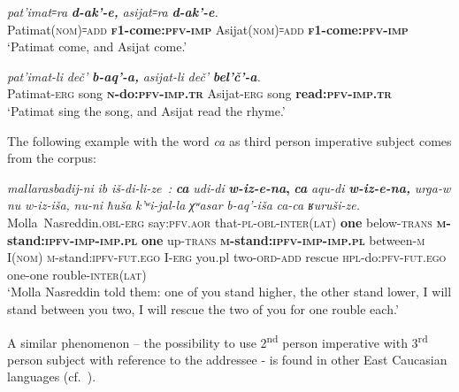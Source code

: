 ﻿\documentclass[output=paper]{langsci/langscibook}
\begin{document}
\ea %
\gll  \emph{pat'imat꞊ra}  \emph{\textbf{d-ak'-e,}}  \emph{asijat꞊ra}  \emph{\textbf{d-ak'-e}.}\\
 Patimat(\textsc{nom})꞊\textsc{add}  \textbf{\textsc{f1}-come:\textsc{pfv}-\textsc{imp}}  Asijat(\textsc{nom})꞊\textsc{add}  \textbf{\textsc{f1}-come:\textsc{pfv}-\textsc{imp}}\\
\glt `Patimat come, and Asijat come.'

\ex %
\gll  \emph{pat'imat-li}  \emph{deč'}  \emph{\textbf{b-aq'-a,}}  \emph{asijat-li}  \emph{deč'}  \emph{\textbf{bel'č'-a}.}\\
 Patimat-\textsc{erg}  song  \textbf{\textsc{n}-do:\textsc{pfv}-\textsc{imp}.\textsc{tr}}  Asijat-\textsc{erg}  song \textbf{read:\textsc{pfv}-\textsc{imp}.\textsc{tr}}\\
\glt `Patimat sing the song, and Asijat read the rhyme.'
\z

The following example with the word \emph{ca} as third person
imperative subject comes from the corpus:

\ea %
\gll  \emph{mallarasbadij-ni}  \emph{ib}  \emph{iš-di-li-ze~:}  \emph{\textbf{ca}}  \emph{udi-di} \textbf{\emph{w-iz-e-na},}  \emph{\textbf{ca}}  \emph{aqu-di} \emph{\textbf{w-iz-e-na,}}  \emph{urga-w} \emph{nu} \emph{w-iz-iša,} \emph{nu-ni} \emph{ħuša} \emph{k'ʷi-jal-la} \emph{χʷasar} \emph{b-aq'-iša} \emph{ca-ca} \emph{ʁuruši-ze.}\\
Molla~Nasreddin.\textsc{obl}-\textsc{erg}  say:\textsc{pfv}.\textsc{aor}  that-\textsc{pl}-\textsc{obl}-\textsc{inter}(\textsc{lat}) \textbf{one}  below-\textsc{trans} \textbf{\textsc{m}-stand:\textsc{ipfv}-\textsc{imp}-\textsc{imp}.\textsc{pl}}  \textbf{one}  up-\textsc{trans}  \textbf{\textsc{m}-stand:\textsc{ipfv}-\textsc{imp}-\textsc{imp}.\textsc{pl}}  between-\textsc{m} I(\textsc{nom})  \textsc{m}-stand:\textsc{ipfv}-\textsc{fut}.\textsc{ego}  I-\textsc{erg}  you.pl  two-\textsc{ord}-\textsc{add} rescue  \textsc{hpl}-do:\textsc{pfv}-\textsc{fut}.\textsc{ego}  one-one  rouble-\textsc{inter}(\textsc{lat})\\
\glt 
`Molla Nasreddin told them: one of you stand higher, the other stand
lower, I will stand between you two, I will rescue the two of you for
one rouble each.'
\z


A similar phenomenon – the possibility to use 2\textsuperscript{nd}
person imperative with 3\textsuperscript{rd} person subject with
reference to the addressee - is found in other East Caucasian languages
(cf.\ \citealt[323]{dobrushina2001}).
\end{document}
